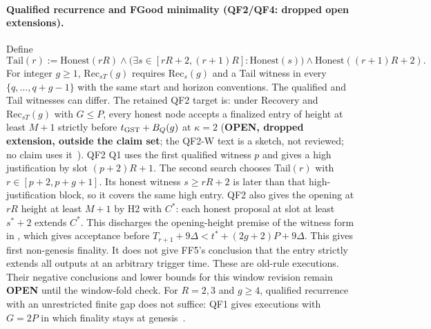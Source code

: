 \documentclass{article}
\theoremstyle{plain}
\theoremstyle{definition}
\theoremstyle{remark}
\newcommand{\OPEN}{\textbf{OPEN}}
\begin{document}
\paragraph{Qualified recurrence and FGood minimality (QF2/QF4: dropped open extensions).}
Define
\[
 \mathrm{Tail}(r):=\mathrm{Honest}(rR)\land
 \bigl(\exists s\in[rR+2,(r+1)R]:\mathrm{Honest}(s)\bigr)
 \land\mathrm{Honest}((r+1)R+2).
\]
For integer $g\geq1$, $\mathrm{Rec}_{sT}(g)$ requires $\mathrm{Rec}_{s}(g)$
and a Tail witness in every $\{q,\ldots,q+g-1\}$ with the same start and
horizon conventions.  The qualified and Tail witnesses can differ.
The retained QF2 target is: under Recovery and $\mathrm{Rec}_{sT}(g)$ with $G\leq P$, every
honest node accepts a finalized entry of height at least $M+1$
strictly before $t_{\rm GST}+B_Q(g)$ at $\kappa=2$ (\textbf{OPEN, dropped extension, outside the claim set};
the QF2-W text is a sketch, not reviewed; no claim uses it~\cite[QF2-W]{BPF}).
QF2 Q1 uses the first qualified witness $p$ and gives a high justification
by slot $(p+2)R+1$.  The second search chooses Tail$(r)$ with
$r\in[p+2,p+g+1]$.  Its honest witness $s\geq rR+2$ is later than
that high-justification block, so it covers the same high entry.
QF2 also gives the opening at $rR$ height at least $M+1$ by H2 with
$C^*$: each honest proposal at slot at least $s^*+2$ extends $C^*$.
This discharges the opening-height premise of the witness form in
, which gives acceptance before
$T_{r+1}+9\Delta<t^*+(2g+2)P+9\Delta$.
This gives first non-genesis finality.  It does not give FF5's conclusion
that the entry strictly extends all outputs at an arbitrary trigger time.
These are old-rule executions.  Their negative conclusions and lower
bounds for this window revision remain \OPEN{} until the window-fold check.
For $R=2,3$ and $g\geq4$, qualified recurrence with an unrestricted
finite gap does not suffice: QF1 gives executions with $G=2P$ in which
finality stays at genesis~\cite[QF1--QF2, N5]{BPF}.
\end{document}

